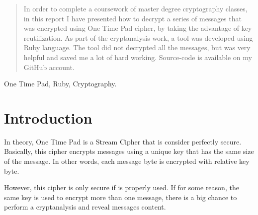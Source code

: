 \documentclass[journal]{IEEEtran}
\begin{document}
\maketitle


\begin{abstract}
In order to complete a coursework of master degree cryptography classes, in this report I have presented how to decrypt a series of messages that was encrypted using One Time Pad cipher, by taking the advantage of key reutilization. As part of the cryptanalysis work, a tool was developed using Ruby language. The tool did not decrypted all the messages, but was very helpful and saved me a lot of hard working. Source-code is available on my GitHub account.
\end{abstract}

\begin{IEEEkeywords}
One Time Pad, Ruby, Cryptography.
\end{IEEEkeywords}

%
\IEEEpeerreviewmaketitle



\section{Introduction}
In theory, One Time Pad is a Stream Cipher that is consider perfectly secure. Basically, this cipher encrypts messages using a unique key that has the same size of the message. In other words, each message byte is encrypted with relative key byte.

However, this cipher is only secure if is properly used. If for some reason, the same key is used to encrypt more than one message, there is a big chance to perform a cryptanalysis and reveal messages content.
\end{document}
